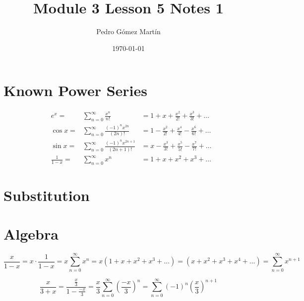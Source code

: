 \documentclass{article}
\author{Pedro G\'{o}mez Mart\'{i}n}
\date{\today}
\title{Module 3 Lesson 5 Notes 1}
\begin{document}
\maketitle
\section{Known Power Series}
	\begin{align}
		&e^{x}=&\sum\limits_{n=0}^{\infty}{\frac{x^n}{n!}}&=1+x+\frac{x^2}{2!}+\frac{x^3}{3!}+\dots\\
		&\cos{x}=&\sum\limits_{n=0}^{\infty}{\frac{\left(-1\right)^{n}x^{2n}}{\left(2n\right)!}}&=1-\frac{x^2}{2!}+\frac{x^4}{4!}-\frac{x^6}{6!}+\dots\\
		&\sin{x}=&\sum\limits_{n=0}^{\infty}{\frac{\left(-1\right)^{n}x^{2n+1}}{\left(2n+1\right)!}}&=x-\frac{x^3}{3!}+\frac{x^5}{5!}-\frac{x^7}{7!}+\dots\\
		&\frac{1}{1-x}=&\sum\limits_{n=0}^{\infty}{x^n}&=1+x+x^2+x^3+\dots
	\end{align}
	
\section{Substitution}
	
\section{Algebra}
	\begin{equation*}
		\frac{x}{1-x} = x\cdot \frac{1}{1-x} = x \sum\limits_{n=0}^{\infty}{x^n} = x\left(1+x+x^2+x^3+\dots \right) = \left(x+x^2+x^3+x^4+\dots \right) = \sum\limits_{n=0}^{\infty}{x^{n+1}}
	\end{equation*}
	\begin{flushright}
	\end{flushright}
	\begin{equation*}
	\frac{x}{3+x} = \frac{\frac{x}{3}}{1-\frac{-x}{3}} = \frac{x}{3}\sum\limits_{n=0}^{\infty}\left(\frac{-x}{3}\right)^{n} = \sum\limits_{n=0}^{\infty}\left(-1\right)^{n}\left(\frac{x}{3}\right)^{n+1}
	\end{equation*}
	\begin{flushright}
		\boxed{\text{$-3<x<3$}}
	\end{flushright}
\end{document}
